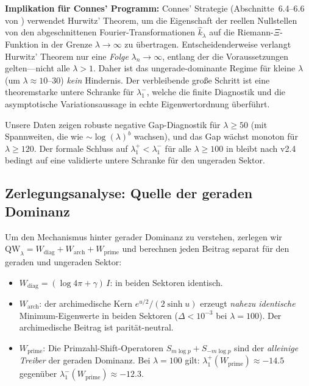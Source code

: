 ﻿\documentclass[12pt,a4paper]{article}
\theoremstyle{definition}
\theoremstyle{remark}
\begin{document}
\textbf{Implikation für Connes' Programm:} Connes' Strategie (Abschnitte~6.4--6.6 von \cite{Connes2026}) verwendet Hurwitz' Theorem, um die Eigenschaft der reellen Nullstellen von den abgeschnittenen Fourier-Transformationen $\hat{k}_\lambda$ auf die Riemann-$\Xi$-Funktion in der Grenze $\lambda \to \infty$ zu übertragen. Entscheidenderweise verlangt Hurwitz' Theorem nur eine \emph{Folge} $\lambda_n \to \infty$, entlang der die Voraussetzungen gelten---nicht alle $\lambda > 1$. Daher ist das ungerade-dominante Regime für kleine $\lambda$ (um $\lambda \approx 10$--$30$) \emph{kein} Hindernis. Der verbleibende große Schritt ist eine theoremstarke untere Schranke für $\lambda_1^-$, welche die finite Diagnostik und die asymptotische Variationsaussage in echte Eigenwertordnung überführt.

Unsere Daten zeigen robuste negative Gap-Diagnostik für $\lambda \geq 50$ (mit Spannweiten, die wie $\sim \log(\lambda)^b$ wachsen), und das Gap wächst monoton für $\lambda \geq 120$. Der formale Schluss auf $\lambda_1^+ < \lambda_1^-$ für alle $\lambda \geq 100$ in  bleibt nach v2.4 bedingt auf eine validierte untere Schranke für den ungeraden Sektor.

\subsection{Zerlegungsanalyse: Quelle der geraden Dominanz}

Um den Mechanismus hinter gerader Dominanz zu verstehen, zerlegen wir $\mathrm{QW}_\lambda = W_{\mathrm{diag}} + W_{\mathrm{arch}} + W_{\mathrm{prime}}$ und berechnen jeden Beitrag separat für den geraden und ungeraden Sektor:

\begin{itemize}
  \item $W_{\mathrm{diag}} = (\log 4\pi + \gamma)\,I$: in beiden Sektoren identisch.
  \item $W_{\mathrm{arch}}$: der archimedische Kern $e^{u/2}/(2\sinh u)$ erzeugt \emph{nahezu identische} Minimum-Eigenwerte in beiden Sektoren ($\Delta < 10^{-3}$ bei $\lambda = 100$). Der archimedische Beitrag ist parität-neutral.
  \item $W_{\mathrm{prime}}$: Die Primzahl-Shift-Operatoren $S_{m\log p} + S_{-m\log p}$ sind der \emph{alleinige Treiber} der geraden Dominanz. Bei $\lambda = 100$ gilt: $\lambda_1^+(W_{\mathrm{prime}}) \approx -14.5$ gegenüber $\lambda_1^-(W_{\mathrm{prime}}) \approx -12.3$.
\end{itemize}
\end{document}
